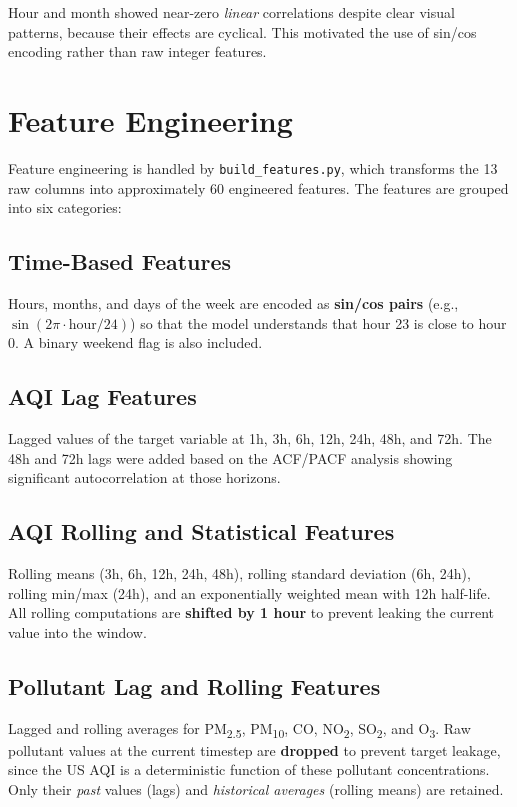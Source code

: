 \documentclass[12pt, a4paper]{article}
\begin{document}
Hour and month showed near-zero \emph{linear} correlations despite clear visual patterns, because their effects are cyclical.  This motivated the use of sin/cos encoding rather than raw integer features.


\section{Feature Engineering}
\label{sec:features}

Feature engineering is handled by \texttt{build\_features.py}, which transforms the 13 raw columns into approximately 60 engineered features.  The features are grouped into six categories:

\subsection{Time-Based Features}

Hours, months, and days of the week are encoded as \textbf{sin/cos pairs} (e.g., $\sin(2\pi \cdot \text{hour}/24)$) so that the model understands that hour 23 is close to hour 0.  A binary weekend flag is also included.

\subsection{AQI Lag Features}

Lagged values of the target variable at 1h, 3h, 6h, 12h, 24h, 48h, and 72h.  The 48h and 72h lags were added based on the ACF/PACF analysis showing significant autocorrelation at those horizons.

\subsection{AQI Rolling and Statistical Features}

Rolling means (3h, 6h, 12h, 24h, 48h), rolling standard deviation (6h, 24h), rolling min/max (24h), and an exponentially weighted mean with 12h half-life.  All rolling computations are \textbf{shifted by 1 hour} to prevent leaking the current value into the window.

\subsection{Pollutant Lag and Rolling Features}

Lagged and rolling averages for PM\textsubscript{2.5}, PM\textsubscript{10}, CO, NO\textsubscript{2}, SO\textsubscript{2}, and O\textsubscript{3}.  Raw pollutant values at the current timestep are \textbf{dropped} to prevent target leakage, since the US AQI is a deterministic function of these pollutant concentrations.  Only their \emph{past} values (lags) and \emph{historical averages} (rolling means) are retained.
\end{document}
